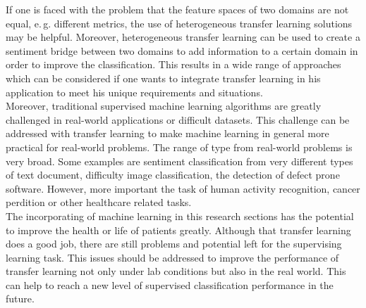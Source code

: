 If one is faced with the problem that the feature spaces of two domains are not equal, e.\,g. different metrics, the use of heterogeneous transfer learning solutions may be helpful.
Moreover, heterogeneous transfer learning can be used to create a sentiment bridge between two domains to add information to a certain domain in order to improve the classification.
This results in a wide range of approaches which can be considered if one wants to integrate transfer learning in his application to meet his unique requirements and situations.\\
Moreover, traditional supervised machine learning algorithms are greatly challenged in real-world applications or difficult datasets.\cite{Pan.2010}
This challenge can be addressed with transfer learning to make machine learning in general more practical for real-world problems.
The range of type from real-world problems is very broad.
Some examples are sentiment classification from very different types of text document, difficulty image classification, the detection of defect prone software.\cite{Weiss.2016}
However, more important the task of human activity recognition, cancer perdition or other healthcare related tasks.\cite{Burlina.2017}\cite{Kourou.2015}\\
The incorporating of machine learning in this research sections has the potential to improve the health or life of patients greatly.
Although that transfer learning does a good job, there are still problems and potential left for the supervising learning task.
This issues should be addressed to improve the performance of transfer learning not only under lab conditions but also in the real world.
This can help to reach a new level of supervised classification performance in the future.
